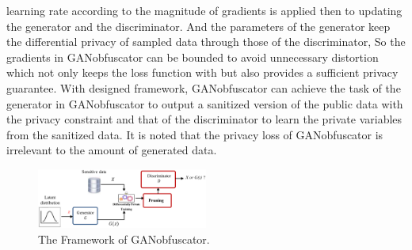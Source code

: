 \documentclass[conference]{IEEEtran}
\begin{document}
learning rate according to the magnitude of gradients is applied then to updating the generator and the discriminator. And the parameters of the generator keep the differential privacy of sampled data through those of the discriminator, So the gradients in GANobfuscator can be bounded to avoid unnecessary distortion which not only keeps the loss function with but also provides a sufficient privacy guarantee. With designed framework, GANobfuscator can achieve the task of the generator in GANobfuscator to output a sanitized version of the public data with the privacy constraint and that of the discriminator to learn the private variables from the sanitized data. It is noted that the privacy loss of GANobfuscator is irrelevant to the amount of generated data.
\begin{figure}[htbp]
    \centerline{\includegraphics[width=0.5\textwidth,height=0.15\textwidth]{GANobfuscator.png}}
    \caption{The Framework of GANobfuscator.}
    \label{fig8}
\end{figure}\\
\end{document}
